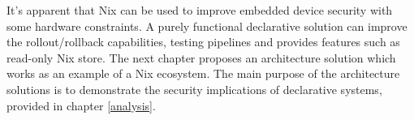 It's apparent that Nix can be used to improve embedded device security
with some hardware constraints. A purely functional declarative
solution can improve the rollout/rollback capabilities, testing
pipelines and provides features such as read-only Nix store. The next
chapter proposes an architecture solution which works as an example of
a Nix ecosystem. The main purpose of the architecture solutions is to
demonstrate the security implications of declarative systems, provided
in chapter \ref{analysis}. 
